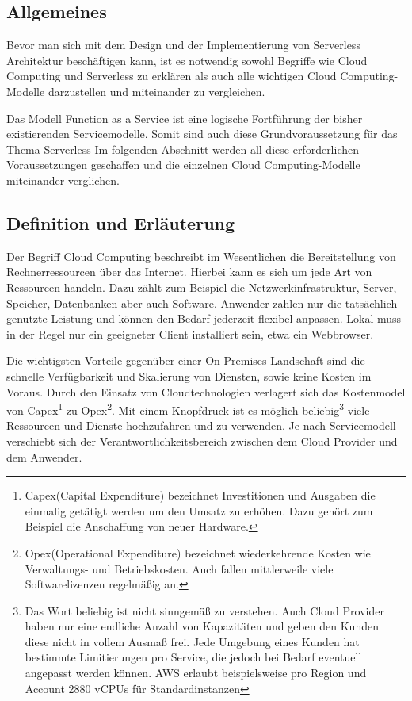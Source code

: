 \subsection{Allgemeines}

Bevor man sich mit dem Design und der Implementierung von Serverless Architektur beschäftigen kann, ist es notwendig sowohl Begriffe wie Cloud Computing und Serverless zu erklären als auch alle wichtigen Cloud Computing-Modelle darzustellen und miteinander zu vergleichen.

Das Modell Function as a Service ist eine logische Fortführung der bisher existierenden Servicemodelle.
Somit sind auch diese Grundvoraussetzung für das Thema Serverless
Im folgenden Abschnitt werden all diese erforderlichen Voraussetzungen geschaffen und die einzelnen Cloud Computing-Modelle miteinander verglichen.


\subsection{Definition und Erläuterung}
Der Begriff Cloud Computing beschreibt im Wesentlichen die Bereitstellung von Rechnerressourcen über das Internet.
Hierbei kann es sich um jede Art von Ressourcen handeln. Dazu zählt zum Beispiel die Netzwerkinfrastruktur, Server, Speicher, Datenbanken aber auch Software.
Anwender zahlen nur die tatsächlich genutzte Leistung und können den Bedarf jederzeit flexibel anpassen.
Lokal muss in der Regel nur ein geeigneter Client installiert sein, etwa ein Webbrowser.

Die wichtigsten Vorteile gegenüber einer On Premises-Landschaft sind die schnelle Verfügbarkeit und Skalierung von Diensten, sowie keine Kosten im Voraus.
Durch den Einsatz von Cloudtechnologien verlagert sich das Kostenmodel von Capex\footnote{ Capex(Capital Expenditure) bezeichnet Investitionen und Ausgaben die einmalig getätigt werden
um den Umsatz zu erhöhen. Dazu gehört zum Beispiel die Anschaffung von neuer Hardware. } zu Opex\footnote{Opex(Operational Expenditure) bezeichnet wiederkehrende Kosten wie Verwaltungs- und Betriebskosten.
Auch fallen mittlerweile viele Softwarelizenzen regelmäßig an. }.
Mit einem Knopfdruck ist es möglich beliebig\footnote{Das Wort beliebig ist nicht sinngemäß zu verstehen.
Auch Cloud Provider haben nur eine endliche Anzahl von Kapazitäten und geben den Kunden diese nicht in vollem Ausmaß frei.
Jede Umgebung eines Kunden hat bestimmte Limitierungen pro Service, die jedoch bei Bedarf eventuell angepasst werden können.
AWS erlaubt beispielsweise pro Region und Account 2880 vCPUs für Standardinstanzen } viele Ressourcen und Dienste hochzufahren und zu verwenden.
Je nach Servicemodell verschiebt sich der Verantwortlichkeitsbereich zwischen dem Cloud Provider und dem Anwender.
\cite[]{CloudComputingDef}


